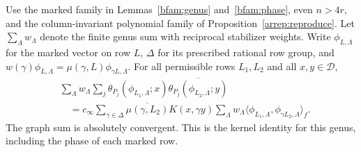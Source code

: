 \begin{proposition}\label{dg:identity}
Use the marked family in Lemmas~\ref{bfam:genus} and~\ref{bfam:phase},
even $n>4r$, and the column-invariant polynomial family of
Proposition~\ref{arrep:reproduce}. Let $\sum_\Lambda w_\Lambda$
denote the finite genus sum with reciprocal stabilizer weights.
Write $\phi_{L,\Lambda}$ for the marked vector on row $L$,
$\Delta$ for its prescribed rational row group, and
$w(\gamma)\phi_{L,\Lambda}=\mu(\gamma,L)\phi_{\gamma L,\Lambda}$.
For all permissible rows $L_1,L_2$ and all $x,y\in\mathcal D$,
\[
\begin{split}
 &\sum_\Lambda w_\Lambda\sum_j
    \theta_{P_j}(\phi_{L_1,\Lambda};x)
           \overline{\theta_{P_j}(\phi_{L_2,\Lambda};y)}\\
 &\quad=c_\infty\sum_{\gamma\in\Delta}\overline{\mu(\gamma,L_2)}
               K(x,\gamma y)
       \sum_\Lambda w_\Lambda
       \langle\phi_{L_1,\Lambda},\phi_{\gamma L_2,\Lambda}\rangle_f .
\end{split}
\]
The graph sum is absolutely convergent. This is the kernel identity
for this genus, including the phase of each marked row.
\end{proposition}
